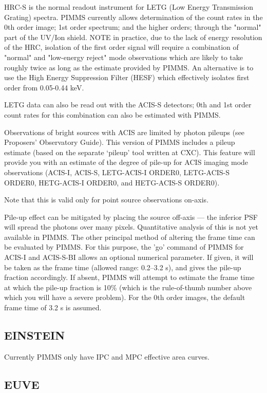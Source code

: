 \documentclass[11pt]{article}
\begin{document}
HRC-S is the normal readout instrument for LETG (Low Energy
Transmission Grating) spectra. PIMMS currently
allows determination of the count rates in the 0th order image; 1st order
spectrum; and the higher orders; through the "normal" part of the UV/Ion
shield.  NOTE in practice, due to the lack of energy resolution of the HRC,
isolation of the first order signal will require a combination of "normal"
and "low-energy reject" mode observations which are likely to take roughly
twice as long as the estimate provided by PIMMS. An alternative is to use
the High Energy Suppression Filter (HESF) which effectively isolates first
order from 0.05-0.44 keV.

LETG data can also be read out with the ACIS-S detectors; 0th and 1st order
count rates for this combination can also be estimated with PIMMS.

Observations of bright sources with ACIS are limited by photon pileups
(see Proposers' Observatory Guide).  This version of PIMMS includes a
pileup estimate (based on the separate `pileup' tool written at CXC).
This feature will provide you with an estimate of the degree of pile-up
for ACIS imaging mode observations (ACIS-I, ACIS-S, LETG-ACIS-I ORDER0,
LETG-ACIS-S ORDER0, HETG-ACIS-I ORDER0, and HETG-ACIS-S ORDER0).

Note that this is valid only for point source observations on-axis.

Pile-up effect can be mitigated by placing the source off-axis --- the
inferior PSF will spread the photons over many pixels.  Quantitative
analysis of this is not yet available in PIMMS.   The other principal
method of altering the frame time can be evaluated by PIMMS.  For this
purpose, the 'go' command of PIMMS for ACIS-I and ACIS-S-BI allows an
optional numerical parameter.  If given, it will be taken as the frame
time (allowed range: 0.2--3.2 s), and gives the pile-up fraction
accordingly.  If absent, PIMMS will attempt to estimate the frame time
at which the pile-up fraction is 10\% (which is the rule-of-thumb number
above which you will have a severe problem).  For the 0th order
images, the default frame time of 3.2 s is assumed.

\subsection{EINSTEIN}

Currently PIMMS only have IPC and MPC effective area curves.

\subsection{EUVE}
\end{document}
